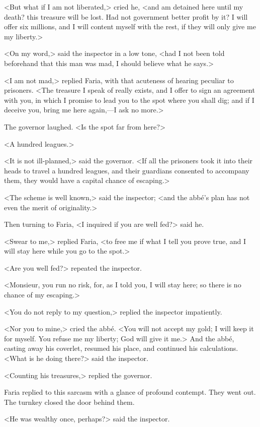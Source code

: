  <But what if I am not liberated,> cried he, <and am detained here until my death? this treasure will be lost. Had not government better profit by it? I will offer six millions, and I will content myself with the rest, if they will only give me my liberty.> 

 <On my word,> said the inspector in a low tone, <had I not been told beforehand that this man was mad, I should believe what he says.> 

 <I am not mad,> replied Faria, with that acuteness of hearing peculiar to prisoners. <The treasure I speak of really exists, and I offer to sign an agreement with you, in which I promise to lead you to the spot where you shall dig; and if I deceive you, bring me here again,—I ask no more.> 

 The governor laughed. <Is the spot far from here?> 

 <A hundred leagues.> 

 <It is not ill-planned,> said the governor. <If all the prisoners took it into their heads to travel a hundred leagues, and their guardians consented to accompany them, they would have a capital chance of escaping.> 

 <The scheme is well known,> said the inspector; <and the abbé's plan has not even the merit of originality.> 

 Then turning to Faria, <I inquired if you are well fed?> said he. 

 <Swear to me,> replied Faria, <to free me if what I tell you prove true, and I will stay here while you go to the spot.> 

 <Are you well fed?> repeated the inspector. 

 <Monsieur, you run no risk, for, as I told you, I will stay here; so there is no chance of my escaping.> 

 <You do not reply to my question,> replied the inspector impatiently. 

 <Nor you to mine,> cried the abbé. <You will not accept my gold; I will keep it for myself. You refuse me my liberty; God will give it me.> And the abbé, casting away his coverlet, resumed his place, and continued his calculations.  <What is he doing there?> said the inspector. 

 <Counting his treasures,> replied the governor. 

 Faria replied to this sarcasm with a glance of profound contempt. They went out. The turnkey closed the door behind them. 

 <He was wealthy once, perhaps?> said the inspector. 


